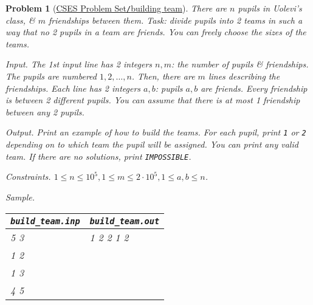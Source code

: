 \documentclass{article}
\newtheorem{problem}{Problem}
\begin{document}
\begin{problem}[\href{https://cses.fi/problemset/task/1668}{CSES Problem Set{\tt/}building team}]
	There are $n$ pupils in Uolevi's class, \& $m$ friendships between them. Task: divide pupils into 2 teams in such a way that no 2 pupils in a team are friends. You can freely choose the sizes of the teams.
	\item {\sf Input.} The 1st input line has 2 integers $n,m$: the number of pupils \& friendships. The pupils are numbered $1,2,\ldots,n$. Then, there are $m$ lines describing the friendships. Each line has 2 integers $a,b$: pupils $a,b$ are friends. Every friendship is between 2 different pupils. You can assume that there is at most 1 friendship between any 2 pupils.
	\item {\sf Output.} Print an example of how to build the teams. For each pupil, print {\tt1} or {\tt2} depending on to which team the pupil will be assigned. You can print any valid team. If there are no solutions, print {\tt IMPOSSIBLE}.
	\item {\sf Constraints.} $1\le n\le10^5,1\le m\le2\cdot10^5,1\le a,b\le n$.
	\item {\sf Sample.}
	\begin{table}[H]
		\centering
		\begin{tabular}{|l|l|}
			\hline
			\verb|build_team.inp| & \verb|build_team.out| \\
			\hline
			5 3 & 1 2 2 1 2 \\
			1 2 & \\
			1 3 & \\
			4 5 & \\
			\hline
		\end{tabular}
	\end{table}
\end{problem}
\end{document}
